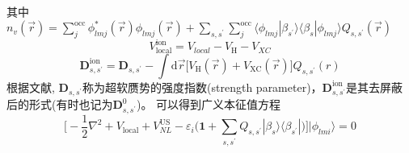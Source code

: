 其中$n_v(\vec r)=\sum\limits_j^{\mathrm{occ}}\phi_{lmj}^{\ast}(\vec r)\phi_{lmj}(\vec r)+\sum\limits_{s,s^{\prime}}\sum\limits_j^{\mathrm{occ}}\langle\phi_{lmj}|\beta_{s^{\prime}}\rangle\langle\beta_s|\phi_{lmj}\rangle Q_{s,s^{\prime}}(\vec r)$
	$$V_{\mathrm{local}}^{\mathrm{ion}}=V_{local}-V_{\mathrm H}-V_{XC}$$
	\begin{equation}
		\mathbf{D}_{s,s^{\prime}}^{\mathrm{ion}}=\mathbf{D}_{s,s^{\prime}}-\int\mathrm{d}\vec r\big[V_{\mathrm{H}}(\vec r)+V_{\mathrm{XC}}(\vec r)\big]Q_{s,s^{\prime}}(r)
		\label{eq:uspp_6}
	\end{equation}
根据文献, $\mathbf{D}_{s,s^{\prime}}$称为超软赝势的强度指数(\textrm{strength parameter})，$\mathbf{D}_{s,s^{\prime}}^{\mathrm{ion}}$是其去屏蔽后的形式(有时也记为$\mathbf{D}_{s,s^{\prime}}^0$)。
可以得到广义本征值方程
\begin{equation}
	\bigg[-\dfrac12\nabla^2+V_{\mathrm{local}}+V_{NL}^{\mathrm{US}}-\varepsilon_i\bigg(\mathbf{1}+\sum_{s,s^{\prime}}Q_{s,s^{\prime}}|\beta_s\rangle\langle\beta_{s^{\prime}}|\bigg)\bigg]|\phi_{lmi}\rangle=0
	\label{eq:uspp_7}
\end{equation}
